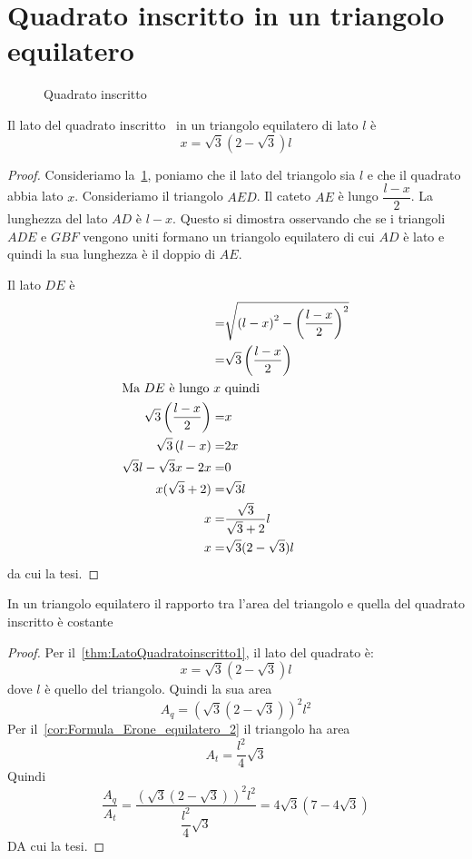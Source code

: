 \section{Quadrato inscritto in un triangolo equilatero}
\begin{figure}
	\centering
	
	\caption{Quadrato inscritto}
	\label{fig:Quadratoinscritto1}
\end{figure}
\begin{thm}\label{thm:LatoQuadratoinscritto1}
Il lato del quadrato inscritto~\cite{Gregorio2025} in un triangolo equilatero di lato $l$ è 
\[x=\sqrt{3}(2-\sqrt{3})l\] 
\end{thm}
\begin{proof}
	Consideriamo la~\cref{fig:Quadratoinscritto1}, poniamo che il lato del triangolo sia $l$ e che il quadrato abbia lato $x$. Consideriamo il triangolo $AED$. Il cateto $AE$ è lungo $\dfrac{l-x}{2}$. La lunghezza del lato $AD$ è $l-x$. Questo si dimostra osservando che se i triangoli $ADE$ e $GBF$ vengono uniti formano un triangolo equilatero di cui $AD$ è lato e quindi la sua lunghezza è il doppio di $AE$.   
	
	Il lato $DE$ è
	\begin{align*}
			=&\sqrt{\left(l-x\right)^2-\left(\dfrac{l-x}{2}\right)^2}\\
			=&\sqrt{3}\left(\dfrac{l-x}{2}\right)\\
			\intertext{Ma $DE$ è lungo $x$ quindi}
			\sqrt{3}\left(\dfrac{l-x}{2}\right)=&x\\
			\sqrt{3}\left(l-x\right)=&2x\\
			\sqrt{3}l-\sqrt{3}x-2x=&0\\
			x(\sqrt{3}+2)=&\sqrt{3}l\\
			x=&\dfrac{\sqrt{3}}{\sqrt{3}+2}l\\
			x=&\sqrt{3}(2-\sqrt{3})l\\
	\end{align*}
da cui la tesi.
\end{proof}
\begin{cor}\label{cor:AreaQuadratoinscritto1}
	In un triangolo equilatero il rapporto tra l'area del triangolo e quella del quadrato inscritto è costante
\end{cor}
\begin{proof}
	Per il~\cref{thm:LatoQuadratoinscritto1},  il lato del quadrato è:  \[x=\sqrt{3}(2-\sqrt{3})l\] dove $l$ è quello del triangolo. Quindi la sua area \[A_{q}=\left(\sqrt{3}(2-\sqrt{3})\right)^2l^2\]
	Per il~\cref{cor:Formula_Erone_equilatero_2} il triangolo ha area \[A_{t}=\dfrac{l^2}{4}\sqrt{3}\]
	Quindi \[\dfrac{A_{q}}{A_{t}}=\dfrac{\left(\sqrt{3}(2-\sqrt{3})\right)^2l^2}{\dfrac{l^2}{4}\sqrt{3}}=4\sqrt{3}\left(7-4\sqrt{3}\right)\]
	DA cui la tesi.
\end{proof}